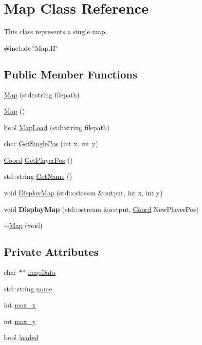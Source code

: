 \hypertarget{class_map}{\section{Map Class Reference}
\label{class_map}
}


This class represents a single map.  




{\ttfamily \#include \char`\"{}Map.\-H\char`\"{}}

\subsection*{Public Member Functions}
\begin{DoxyCompactItemize}
\item 
\hyperlink{class_map_a4f36d9762934af131d2aa3f4a63e6c23}{Map} (std\-::string filepath)
\item 
\hyperlink{class_map_a0f5ad0fd4563497b4214038cbca8b582}{Map} ()
\item 
bool \hyperlink{class_map_a7dbf51d6a23913173be5e53544e2b554}{Map\-Load} (std\-::string filepath)
\item 
char \hyperlink{class_map_aad51424efcfb12601f082afaf9ccb515}{Get\-Single\-Pos} (int x, int y)
\item 
\hyperlink{struct_coord}{Coord} \hyperlink{class_map_a3a51492891d54d61f8c5631f9c7add05}{Get\-Player\-Pos} ()
\item 
std\-::string \hyperlink{class_map_a1de0f97b9c754836502997231780fd0b}{Get\-Name} ()
\item 
void \hyperlink{class_map_af4e742ab5e5b4132e339948c32d076e2}{Display\-Map} (std\-::ostream \&output, int x, int y)
\item 
\hypertarget{class_map_abe6bbdcb0eb732f72923dec6afc0d4b6}{void {\bfseries Display\-Map} (std\-::ostream \&output, \hyperlink{struct_coord}{Coord} New\-Player\-Pos)}\label{class_map_abe6bbdcb0eb732f72923dec6afc0d4b6}

\item 
\hyperlink{class_map_a55d7061de63bc1211c2f52592104d090}{$\sim$\-Map} (void)
\end{DoxyCompactItemize}
\subsection*{Private Attributes}
\begin{DoxyCompactItemize}
\item 
char $\ast$$\ast$ \hyperlink{class_map_a167d123f263f5747306dc4dec00651e1}{map\-Data}
\item 
std\-::string \hyperlink{class_map_a1b1d492ae94e6ce4f76536bd33d8123c}{name}
\item 
int \hyperlink{class_map_afd40399a6a6dc020966bdad376c27fd0}{max\-\_\-x}
\item 
int \hyperlink{class_map_a0b9d5fbb3b2080d4d44f7abc5cde78d0}{max\-\_\-y}
\item 
bool \hyperlink{class_map_ae7fbbd85e0cbd7219a468c56797a694f}{loaded}
\end{DoxyCompactItemize}


